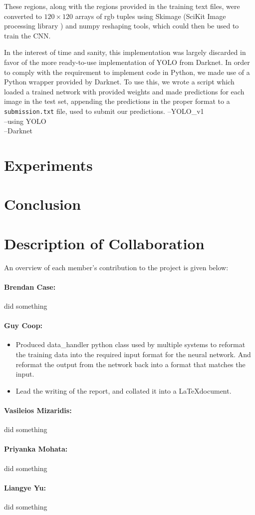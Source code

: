\documentclass[10pt]{article}
\begin{document}
These regions, along with the regions provided in the training text files, were converted to $120\times 120$ arrays of rgb tuples using Skimage (SciKit Image processing library \cite{skimage}) and numpy reshaping tools, which could then be used to train the CNN.

In the interest of time and sanity, this implementation was largely discarded in favor of the more ready-to-use implementation of YOLO from Darknet. In order to comply with the requirement to implement code in Python, we made use of a Python wrapper provided by Darknet. To use this, we wrote a script which loaded a trained network with provided weights and made predictions for each image in the test set, appending the predictions in the proper format to a \texttt{submission.txt} file, used to submit our predictions.
--YOLO\_v1\cite{yolo_v1}\\
--using YOLO\cite{yolo_v2}\\
--Darknet\\

\section{Experiments}

\section{Conclusion}

\section{Description of Collaboration}
An overview of each member's contribution to the project is given below:
\paragraph{Brendan Case:}
did something

\paragraph{Guy Coop:}
\begin{itemize}
	\item Produced data\_handler python class used by multiple systems to reformat the training data into the required input format for the neural network. And reformat the output from the network back into a format that matches the input.
	\item Lead the writing of the report, and collated it into a \LaTeX document.
\end{itemize}

\paragraph{Vasileios Mizaridis:}
did something

\paragraph{Priyanka Mohata:}
did something

\paragraph{Liangye Yu:}
did something

\newpage


\end{document}
